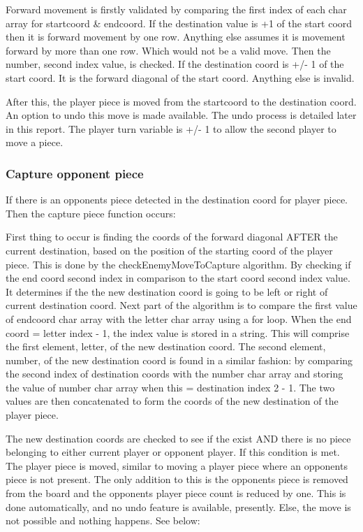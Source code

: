 \documentclass[10pt, a4paper]{article}
\begin{document}
    Forward movement is firstly validated by comparing the first index of each char array for startcoord \& endcoord. If the destination value is +1 of the start coord then it is forward movement by one row. Anything else assumes it is movement forward by more than one row. Which would not be a valid move. Then the number, second index value, is checked. If the destination coord is +/- 1 of the start coord. It is the forward diagonal of the start coord. Anything else is invalid.
    
    After this, the player piece is moved from the startcoord to the destination coord. An option to undo this move is made available. The undo process is detailed later in this report. The player turn variable is +/- 1 to allow the second player to move a piece.
    \subsubsection{Capture opponent piece}
    If there is an opponents piece detected in the destination coord for player piece. Then the capture piece function occurs:
    
    First thing to occur is finding the coords of the forward diagonal AFTER the current destination, based on the position of the starting coord of the player piece. This is done by the checkEnemyMoveToCapture algorithm. By checking if the end coord second index in comparison to the start coord second index value. It determines if the the new destination coord is going to be left or right of current destination coord. Next part of the algorithm is to compare the first value of endcoord char array with the letter char array using a for loop. When the end coord = letter index - 1, the index value is stored in a string. This will comprise the first element, letter, of the new destination coord.
    The second element, number, of the new destination coord is found in a similar fashion: by comparing the second index of destination coords with the number char array and storing the value of number char array when this = destination index 2 - 1. The two values are then concatenated to form the coords of the new destination of the player piece. 
    
    The new destination coords are checked to see if the exist AND there is no piece belonging to  either current player or opponent player. If this condition is met. The player piece is moved, similar to moving a player piece where an opponents piece is not present. The only addition to this is the opponents piece is removed from the board and the opponents player piece count is reduced by one. This is done automatically, and no undo feature is available, presently.
    Else, the move is not possible and nothing happens. See below:
    
\end{document}
